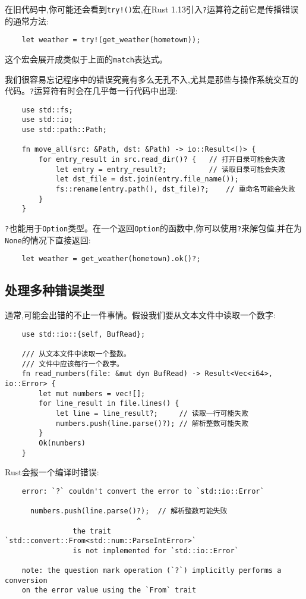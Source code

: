 在旧代码中,你可能还会看到\texttt{try!()}宏,在Rust 1.13引入\texttt{?}运算符之前它是传播错误的通常方法:
\begin{verbatim}
    let weather = try!(get_weather(hometown));
\end{verbatim}
这个宏会展开成类似于上面的\texttt{match}表达式。

我们很容易忘记程序中的错误究竟有多么无孔不入,尤其是那些与操作系统交互的代码。\texttt{?}运算符有时会在几乎每一行代码中出现:
\begin{verbatim}
    use std::fs;
    use std::io;
    use std::path::Path;

    fn move_all(src: &Path, dst: &Path) -> io::Result<()> {
        for entry_result in src.read_dir()? {   // 打开目录可能会失败
            let entry = entry_result?;          // 读取目录可能会失败
            let dst_file = dst.join(entry.file_name());
            fs::rename(entry.path(), dst_file)?;    // 重命名可能会失败
        }
    }
\end{verbatim}

\texttt{?}也能用于\texttt{Option}类型。在一个返回\texttt{Option}的函数中,你可以使用\texttt{?}来解包值,并在为\texttt{None}的情况下直接返回:
\begin{verbatim}
    let weather = get_weather(hometown).ok()?;
\end{verbatim}

\subsection{处理多种错误类型}\label{MultiErr}
通常,可能会出错的不止一件事情。假设我们要从文本文件中读取一个数字:
\begin{verbatim}
    use std::io::{self, BufRead};

    /// 从文本文件中读取一个整数。
    /// 文件中应该每行一个数字。
    fn read_numbers(file: &mut dyn BufRead) -> Result<Vec<i64>, io::Error> {
        let mut numbers = vec![];
        for line_result in file.lines() {
            let line = line_result?;     // 读取一行可能失败
            numbers.push(line.parse()?); // 解析整数可能失败
        }
        Ok(numbers)
    }
\end{verbatim}

Rust会报一个编译时错误:
\begin{verbatim}
    error: `?` couldn't convert the error to `std::io::Error`

      numbers.push(line.parse()?);  // 解析整数可能失败
                               ^
                the trait `std::convert::From<std::num::ParseIntError>`
                is not implemented for `std::io::Error`

    note: the question mark operation (`?`) implicitly performs a conversion
    on the error value using the `From` trait
\end{verbatim}

